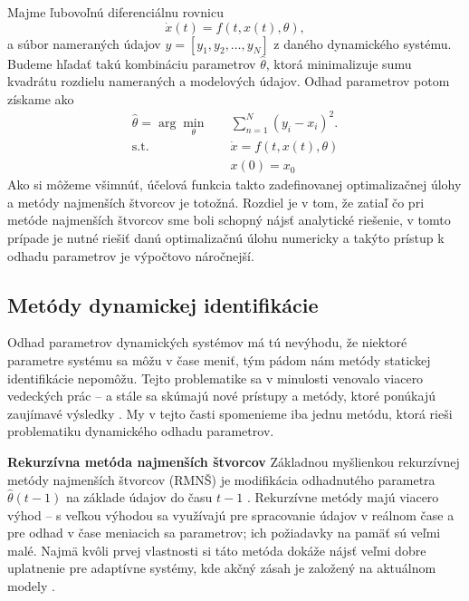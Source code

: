 Majme ľubovoľnú diferenciálnu rovnicu
\begin{equation}
	\dot{x}(t) = f\left( t, x(t), \theta \right),
\end{equation} 
a súbor nameraných údajov $ y = [y_1, y_2, \dots , y_N] $ z daného dynamického systému. Budeme hľadať takú kombináciu parametrov $ \hat{\theta} $, ktorá minimalizuje sumu kvadrátu rozdielu nameraných a modelových údajov. Odhad parametrov potom získame ako
\begin{equation}
	\begin{split}
		\hat{\theta} = \arg \min_{\theta} \quad & \sum_{n=1}^{N} \left(y_{i} - x_{i}\right)^2. \\
		\textrm{s.t.} \quad & \dot{x} = f\left( t,x(t),\theta \right)\\
		 & x(0) = x_0
	\end{split}
	\label{eq:param_est_opt_form}
\end{equation} 
Ako si môžeme všimnúť, účelová funkcia takto zadefinovanej optimalizačnej úlohy a metódy najmenších štvorcov je totožná. Rozdiel je v tom, že zatiaľ čo pri metóde najmenších štvorcov sme boli schopný nájsť analytické riešenie, v tomto prípade je nutné riešiť danú optimalizačnú úlohu numericky a takýto prístup k odhadu parametrov je výpočtovo náročnejší.

\subsection{Metódy dynamickej identifikácie}
Odhad parametrov dynamických systémov má tú nevýhodu, že niektoré parametre systému sa môžu v čase meniť, tým pádom nám metódy statickej identifikácie nepomôžu. Tejto problematike sa v minulosti venovalo viacero vedeckých prác \cite{mehrkanoon:dyn_param_est:2012} -- \cite{stortelder:dyn_param_est:1996} a stále sa skúmajú nové prístupy a metódy, ktoré ponúkajú zaujímavé výsledky \cite{hou:dyn_param_est_nn:2019}. My v tejto časti spomenieme iba jednu metódu, ktorá rieši problematiku dynamického odhadu parametrov.

\textbf{Rekurzívna metóda najmenších štvorcov}
\newline
Základnou myšlienkou rekurzívnej metódy najmenších štvorcov (RMNŠ) je modifikácia odhadnutého parametra $ \hat{\theta}(t-1) $ na základe údajov do času $ t-1 $ \cite{hostetter:recursive_est:1987}. Rekurzívne metódy majú viacero výhod -- s veľkou výhodou sa využívajú pre spracovanie údajov v reálnom čase a pre odhad v čase meniacich sa parametrov; ich požiadavky na pamäť sú veľmi malé. Najmä kvôli prvej vlastnosti si táto metóda dokáže nájsť veľmi dobre uplatnenie pre adaptívne systémy, kde akčný zásah je založený na aktuálnom modely \cite{koo:rmns:2019}.

